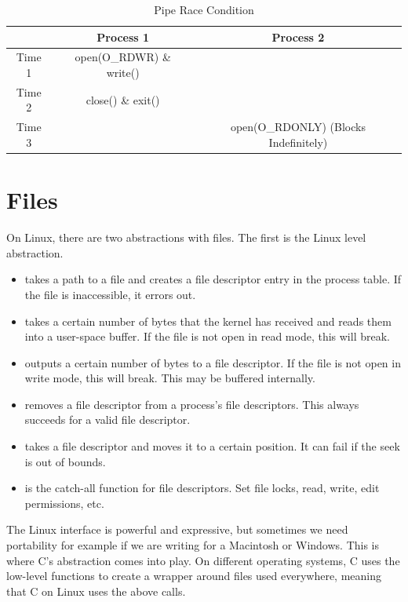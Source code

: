 \begin{center}
	\begin{table}[h]
		\caption{Pipe Race Condition}
		\begin{tabular}{|c|c|c|}
			       & Process 1                & Process 2                             \\ \hline
			Time 1 & open(O\_RDWR) \& write() &                                       \\
			Time 2 & close() \& exit()        &                                       \\
			Time 3 &                          & open(O\_RDONLY) (Blocks Indefinitely) \\
		\end{tabular}
	\end{table}
\end{center}
	 
\section{Files}
	 
On Linux, there are two abstractions with files. The first is the Linux  level abstraction.
	 
\begin{itemize}
	\item {} takes a path to a file and creates a file descriptor entry in the process table. If the file is inaccessible, it errors out.
	\item {} takes a certain number of bytes that the kernel has received and reads them into a user-space buffer. If the file is not open in read mode, this will break.
	\item {} outputs a certain number of bytes to a file descriptor. If the file is not open in write mode, this will break. This may be buffered internally.
	\item {} removes a file descriptor from a process's file descriptors. This always succeeds for a valid file descriptor.
	\item {} takes a file descriptor and moves it to a certain position. It can fail if the seek is out of bounds.
	\item {} is the catch-all function for file descriptors. Set file locks, read, write, edit permissions, etc.
\end{itemize}
	 
The Linux interface is powerful and expressive, but sometimes we need portability for example if we are writing for a Macintosh or Windows.
This is where C's abstraction comes into play.
On different operating systems, C uses the low-level functions to create a wrapper around files used everywhere, meaning that C on Linux uses the above calls.
	 

